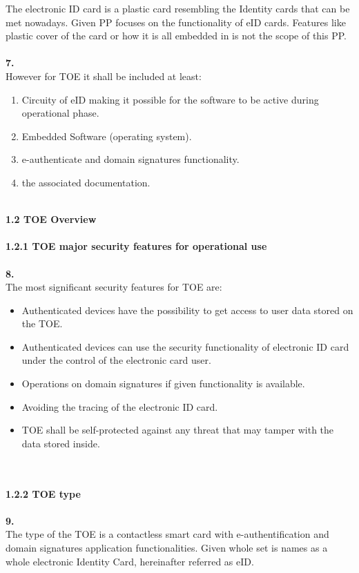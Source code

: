 \documentclass[a4paper, 11pt]{article}%
\begin{document}
The electronic ID card is a plastic card resembling the Identity cards that can be met nowadays. Given PP focuses on the functionality of eID cards. Features like plastic cover of the card or how it is all embedded in is not the scope of this PP. \\\\
\textbf{7.}\\
However for TOE it shall be included at least:
\begin{enumerate}
\item{Circuity of eID making it possible for the software to be active during operational phase.}
\item{Embedded Software (operating system).}
\item{e-authenticate and domain signatures functionality.}
\item{the associated documentation.}\\\\
\end{enumerate}
\textbf{\Large{1.2 TOE Overview}}\\\\
\textbf{\large{1.2.1 TOE major security features for operational use}}\\\\
\textbf{8.}\\
The most significant security features for TOE are:
\begin{itemize}
\item{Authenticated devices have the possibility to get access to user data stored on the TOE.}
\item{Authenticated devices can use the security functionality of electronic ID card under the control of the electronic card user.}
\item{Operations on domain signatures if given functionality is available.}
\item{Avoiding the tracing of the electronic ID card.}
\item{TOE shall be self-protected against any threat that may tamper with the data stored inside.}
\end{itemize}~\\~\\
\textbf{\large{1.2.2 TOE type}}\\\\
\textbf{9.}\\
The type of the TOE is a contactless smart card with e-authentification and domain signatures application functionalities. Given whole set is names as a whole electronic Identity Card, hereinafter referred as eID.\\\\
\end{document}
